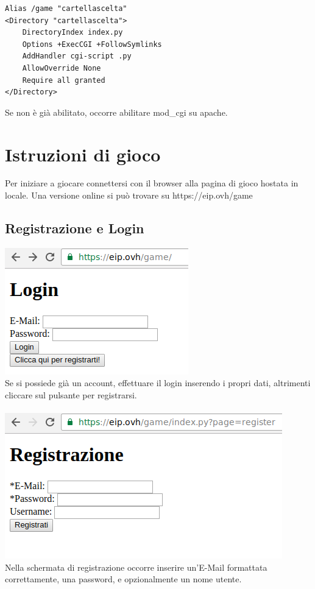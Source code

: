 \documentclass[10pt,a4paper]{article}
\begin{document}
\begin{lstlisting}
Alias /game "cartellascelta"
<Directory "cartellascelta">
    DirectoryIndex index.py
    Options +ExecCGI +FollowSymlinks
    AddHandler cgi-script .py
    AllowOverride None
    Require all granted
</Directory>
\end{lstlisting}

Se non è già abilitato, occorre abilitare mod\_cgi su apache.

\section{Istruzioni di gioco}
Per iniziare a giocare connettersi con il browser alla pagina di gioco hostata in locale. Una versione online si può trovare su https://eip.ovh/game

\subsection{Registrazione e Login}
\includegraphics[scale=0.7]{1login}\\
Se si possiede già un account, effettuare il login inserendo i propri dati, altrimenti cliccare sul pulsante per registrarsi.\\
\\
\includegraphics[scale=0.7]{2registrazione}\\
Nella schermata di registrazione occorre inserire un'E-Mail formattata correttamente, una password, e opzionalmente un nome utente.
\end{document}
